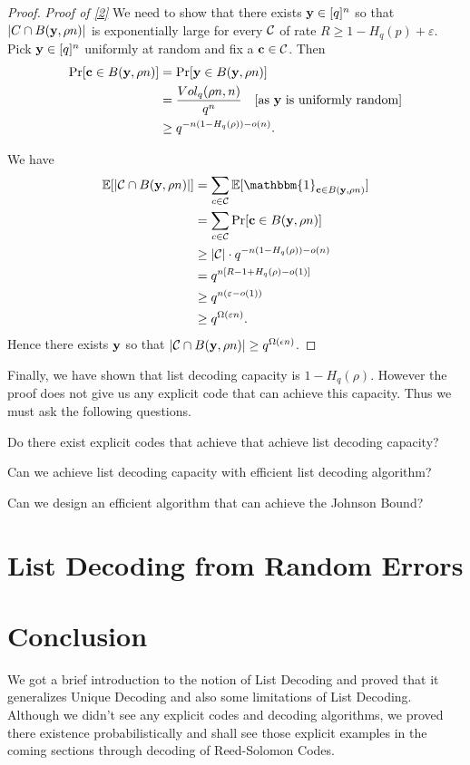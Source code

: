 \begin{proof}
	\noindent\textit{Proof of \ref{2}}
		 We need to show that there exists $\mathbf{y}\in[q]^n$ so that $|C\cap B(\mathbf{y},\rho n)|$ is exponentially large for every $\mathcal{C}$ of rate $R\geq1-H_q(p)+\varepsilon$. Pick $\mathbf{y}\in[q]^n$ uniformly at random and fix a $\mathbf{c}\in\mathcal{C}$. Then
		\begin{align*}
			\Pr[\mathbf{c}\in B(\mathbf{y},\rho n)] 
			& = \Pr[\mathbf{y}\in B(\mathbf{y}, \rho n)]\\
			& = \frac{Vol_q(\rho n,n)}{q^n} \quad \text{[as $\mathbf{y}$ is uniformly random]}\\
			& \geq q^{-n(1-H_q(\rho)) - o(n)}.\\
		\end{align*}
		
		We have 
		\begin{align*}
			\bbe[|\calc\cap B(\bfy, \rho n)|] 
			& = \sum_{c\in\calc}\bbe[\mathbbm{1}_{\bfc\in B(\bfy,\rho n)}]\\
			& = \sum_{c\in\calc}\Pr[\bfc\in B(\bfy,\rho n)] \\
			& \geq |\calc| \cdot q^{-n(1-H_q(\rho)) - o(n)}\\
			& = q^{n[R-1+H_q(\rho) - o(1)]}\\
			& \geq q^{n(\varepsilon -  o(1))}\\
			& \geq q^{\Omega(\varepsilon n)}.
		\end{align*}
		Hence there exists $\mathbf{y}$ so that $|\mathcal{C}\cap B(\mathbf{y}, \rho n)|\geq q^{\Omega(\epsilon n)}$.
	\end{proof}
	
	Finally, we have shown that list decoding capacity is $1 - H_q(\rho)$. However the proof does not give us any explicit code that can achieve this capacity. Thus we must ask the following questions.
	
	\begin{question}[]
				Do there exist explicit codes that achieve that achieve list decoding capacity?
	\end{question}
	\begin{question}[]
		Can we achieve list decoding capacity with efficient list decoding algorithm?
	\end{question} 
	\begin{question}[]
		\label{main}
		Can we design an efficient algorithm that can achieve the Johnson Bound?
	\end{question}
	
	
\section{List Decoding from Random Errors}

\section{Conclusion}
We got a brief introduction to the notion of List Decoding and proved that it generalizes Unique Decoding and also some limitations of List Decoding. Although we didn't see any explicit codes and decoding algorithms, we proved there existence probabilistically and shall see those explicit examples in the coming sections through decoding of Reed-Solomon Codes.

